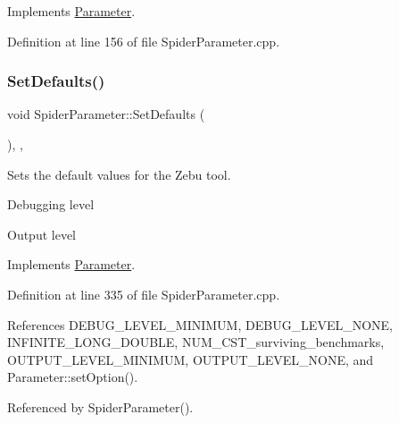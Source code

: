 Implements \hyperlink{classParameter_afe71fca464da99b2ff720d3ad15df051}{Parameter}.



Definition at line 156 of file Spider\+Parameter.\+cpp.

\mbox{\label{classSpiderParameter_afbc320968099098b78d33aa2b36667c1}} 
\subsubsection{\texorpdfstring{Set\+Defaults()}{SetDefaults()}}
{\footnotesize\ttfamily void Spider\+Parameter\+::\+Set\+Defaults (\begin{DoxyParamCaption}{ }\end{DoxyParamCaption})\hspace{0.3cm}{\ttfamily [override]}, {\ttfamily [private]}, {\ttfamily [virtual]}}



Sets the default values for the Zebu tool. 

Debugging level

Output level 

Implements \hyperlink{classParameter_af2bbff2bbfee25d348bd2f0d796d7b3f}{Parameter}.



Definition at line 335 of file Spider\+Parameter.\+cpp.



References D\+E\+B\+U\+G\+\_\+\+L\+E\+V\+E\+L\+\_\+\+M\+I\+N\+I\+M\+UM, D\+E\+B\+U\+G\+\_\+\+L\+E\+V\+E\+L\+\_\+\+N\+O\+NE, I\+N\+F\+I\+N\+I\+T\+E\+\_\+\+L\+O\+N\+G\+\_\+\+D\+O\+U\+B\+LE, N\+U\+M\+\_\+\+C\+S\+T\+\_\+surviving\+\_\+benchmarks, O\+U\+T\+P\+U\+T\+\_\+\+L\+E\+V\+E\+L\+\_\+\+M\+I\+N\+I\+M\+UM, O\+U\+T\+P\+U\+T\+\_\+\+L\+E\+V\+E\+L\+\_\+\+N\+O\+NE, and Parameter\+::set\+Option().



Referenced by Spider\+Parameter().

